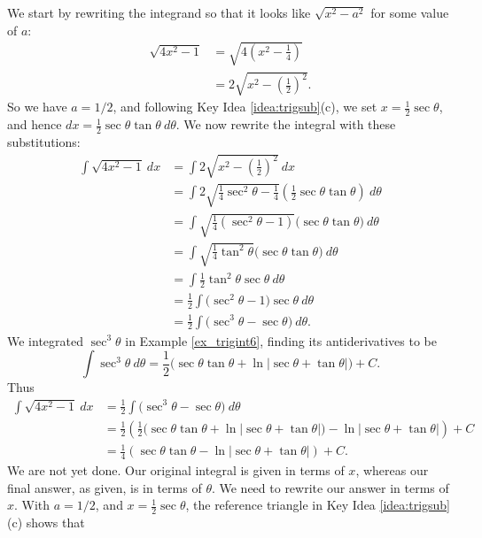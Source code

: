 {We start by rewriting the integrand so that it looks like $\sqrt{x^2-a^2}$ for some value of $a$:
\begin{align*}
\sqrt{4x^2-1} &= \sqrt{4\left(x^2-\frac14\right)}\\
		&= 2\sqrt{x^2-\left(\frac12\right)^2}.
\end{align*}
So we have $a=1/2$, and following Key Idea \ref{idea:trigsub}(c), we set $x= \frac12\sec\theta$, and hence $dx = \frac12\sec\theta\tan\theta\ d\theta$. %
We now rewrite the integral with these substitutions:
\begin{align*}
\int \sqrt{4x^2-1}\ dx &= \int 2\sqrt{x^2-\left(\frac12\right)^2}\ dx\\
			&= \int 2\sqrt{\frac14\sec^2\theta - \frac14}\left(\frac12\sec\theta\tan\theta\right)\ d\theta\\
			&=\int \sqrt{\frac14(\sec^2\theta-1)}\Big(\sec\theta\tan\theta\Big)\ d\theta\\
			&=\int\sqrt{\frac14\tan^2\theta}\Big(\sec\theta\tan\theta\Big)\ d\theta\\
			&=\int \frac12\tan^2\theta\sec\theta\ d\theta\\
			&=\frac12\int \Big(\sec^2\theta-1\Big)\sec\theta\ d\theta\\
			&=\frac12\int \big(\sec^3\theta - \sec\theta\big)\ d\theta.
\end{align*}
We integrated $\sec^3\theta$ in Example \ref{ex_trigint6}, finding its antiderivatives to be
$$\int \sec^3\theta\ d\theta = \frac12\Big(\sec \theta\tan \theta + \ln|\sec \theta+\tan \theta|\Big)+C.$$
\enlargethispage{2\baselineskip}
Thus
\begin{align*}
\int \sqrt{4x^2-1}\ dx &=\frac12\int \big(\sec^3\theta - \sec\theta\big)\ d\theta\\
			&= \frac12\left(\frac12\Big(\sec \theta\tan \theta + \ln|\sec \theta+\tan \theta|\Big) -\ln|\sec \theta + \tan\theta|\right) + C\\
			&= \frac14\left(\sec\theta\tan\theta -\ln|\sec\theta+\tan\theta|\right)+C.
\end{align*}
We are not yet done. Our original integral is given in terms of $x$, whereas our final answer, as given, is in terms of $\theta$. We need to rewrite our answer in terms of $x$. With $a=1/2$, and $x=\frac12\sec\theta$, the reference triangle in Key Idea \ref{idea:trigsub}(c) shows that 
}
